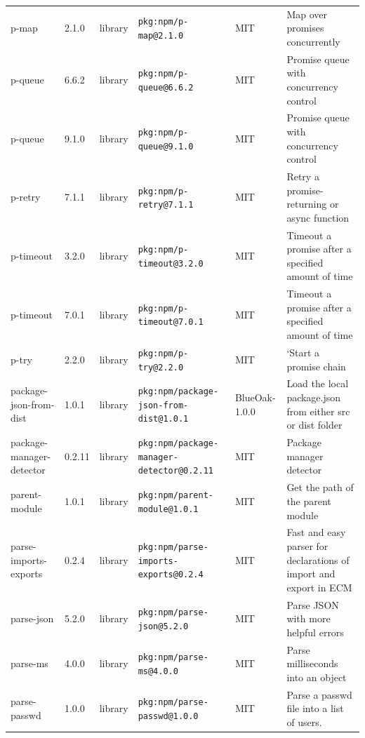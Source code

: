 \documentclass[11pt,a4paper]{article}
\begin{document}
\begin{longtable}{|p{4cm}|p{2cm}|p{1.6cm}|p{5cm}|p{1.5cm}|p{3.5cm}|}
\raggedright p-map & 2.1.0 & library & \small\texttt{pkg:npm/p-map@2.1.0} & MIT & \small Map over promises concurrently \\
\raggedright p-queue & 6.6.2 & library & \small\texttt{pkg:npm/p-queue@6.6.2} & MIT & \small Promise queue with concurrency control \\
\raggedright p-queue & 9.1.0 & library & \small\texttt{pkg:npm/p-queue@9.1.0} & MIT & \small Promise queue with concurrency control \\
\raggedright p-retry & 7.1.1 & library & \small\texttt{pkg:npm/p-retry@7.1.1} & MIT & \small Retry a promise-returning or async function \\
\raggedright p-timeout & 3.2.0 & library & \small\texttt{pkg:npm/p-timeout@3.2.0} & MIT & \small Timeout a promise after a specified amount of time \\
\raggedright p-timeout & 7.0.1 & library & \small\texttt{pkg:npm/p-timeout@7.0.1} & MIT & \small Timeout a promise after a specified amount of time \\
\raggedright p-try & 2.2.0 & library & \small\texttt{pkg:npm/p-try@2.2.0} & MIT & \small `Start a promise chain \\
\raggedright package-json-from-dist & 1.0.1 & library & \small\texttt{pkg:npm/package-json-from-dist@1.0.1} & BlueOak-1.0.0 & \small Load the local package.json from either src or dist folder \\
\raggedright package-manager-detector & 0.2.11 & library & \small\texttt{pkg:npm/package-manager-detector@0.2.11} & MIT & \small Package manager detector \\
\raggedright parent-module & 1.0.1 & library & \small\texttt{pkg:npm/parent-module@1.0.1} & MIT & \small Get the path of the parent module \\
\raggedright parse-imports-exports & 0.2.4 & library & \small\texttt{pkg:npm/parse-imports-exports@0.2.4} & MIT & \small Fast and easy parser for declarations of import and export in ECM \\
\raggedright parse-json & 5.2.0 & library & \small\texttt{pkg:npm/parse-json@5.2.0} & MIT & \small Parse JSON with more helpful errors \\
\raggedright parse-ms & 4.0.0 & library & \small\texttt{pkg:npm/parse-ms@4.0.0} & MIT & \small Parse milliseconds into an object \\
\raggedright parse-passwd & 1.0.0 & library & \small\texttt{pkg:npm/parse-passwd@1.0.0} & MIT & \small Parse a passwd file into a list of users. \\

\end{longtable}
\end{document}
